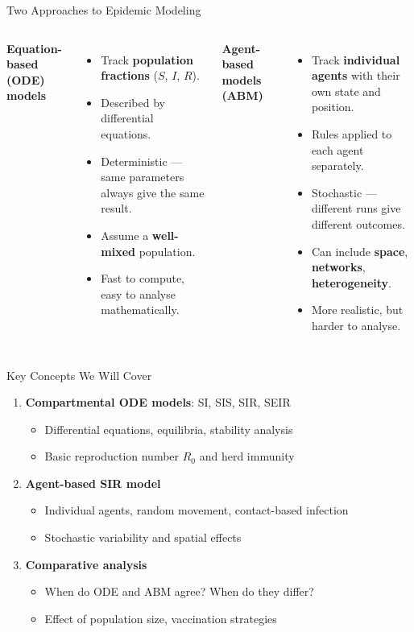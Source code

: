 \begin{frame}{Two Approaches to Epidemic Modeling}
  \begin{columns}[t]
    \textbf{Equation-based (ODE) models}
    \begin{itemize}
      \item Track \textbf{population fractions} ($S$, $I$, $R$).
      \item Described by differential equations.
      \item Deterministic --- same parameters always give the same result.
      \item Assume a \textbf{well-mixed} population.
      \item Fast to compute, easy to analyse mathematically.
    \end{itemize}
  \pause
    \textbf{Agent-based models (ABM)}
    \begin{itemize}
      \item Track \textbf{individual agents} with their own state and position.
      \item Rules applied to each agent separately.
      \item Stochastic --- different runs give different outcomes.
      \item Can include \textbf{space}, \textbf{networks}, \textbf{heterogeneity}.
      \item More realistic, but harder to analyse.
    \end{itemize}
  \end{columns}
  \vfill
\end{frame}

\begin{frame}{Key Concepts We Will Cover}
  \begin{enumerate}
    \item \textbf{Compartmental ODE models}: SI, SIS, SIR, SEIR
      \begin{itemize}
        \item Differential equations, equilibria, stability analysis
        \item Basic reproduction number $R_0$ and herd immunity
      \end{itemize}
    \vfill \pause
    \item \textbf{Agent-based SIR model}
      \begin{itemize}
        \item Individual agents, random movement, contact-based infection
        \item Stochastic variability and spatial effects
      \end{itemize}
    \vfill \pause
    \item \textbf{Comparative analysis}
      \begin{itemize}
        \item When do ODE and ABM agree? When do they differ?
        \item Effect of population size, vaccination strategies
      \end{itemize}
  \end{enumerate}
\end{frame}

